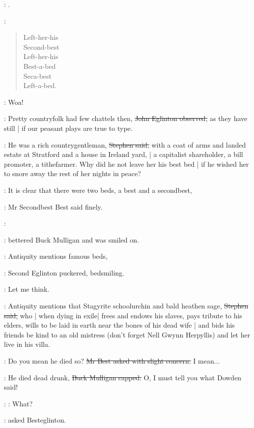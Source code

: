 \StephenInt:
.

\StephenInt:
\begin{verse}
    Left-her-his \\
    Second-best \\
    Left-her-his \\
    Best-a-bed \\
    Seca-best \\
    Left-a-bed.
\end{verse}

\StephenInt:
Woa!

\eglinton:
Pretty countryfolk had few chattels then,
\sout{John Eglinton observed,}
as they have still |
if our peasant plays are true to type.

\Stephen:
He was a rich countrygentleman,
\sout{Stephen said,}
with a coat of arms and landed estate at Stratford and a house in Ireland yard, |
a capitalist shareholder,
a bill promoter,
a tithefarmer.
Why did he not leave her his best bed |
if he wished her to snore away the rest of her nights in peace?

\best:
It is clear that there were two beds,
a best and a secondbest,

:
Mr Secondbest Best said finely.

\mulligan:

:
bettered Buck Mulligan and was smiled on.

\eglinton:
Antiquity mentions famous beds,

:
Second Eglinton puckered, bedsmiling.

\eglinton:
Let me think.

\Stephen:
Antiquity mentions
that Stagyrite schoolurchin and bald heathen sage,
\sout{Stephen said,}
who |
when dying in exile|
frees and endows his slaves,
pays tribute to his elders,
wills to be laid in earth near the bones of his dead wife |
and bids his friends be kind to an old mistress
(don't forget Nell Gwynn Herpyllis)
and let her live in his villa.

\best:
Do you mean he died so?
\sout{Mr Best asked with slight concern.}
I mean...

\mulligan:
He died dead drunk,
\sout{Buck Mulligan capped.}
O, I must tell you what Dowden said!

\best:
\eglinton:
What?

:
asked Besteglinton.

